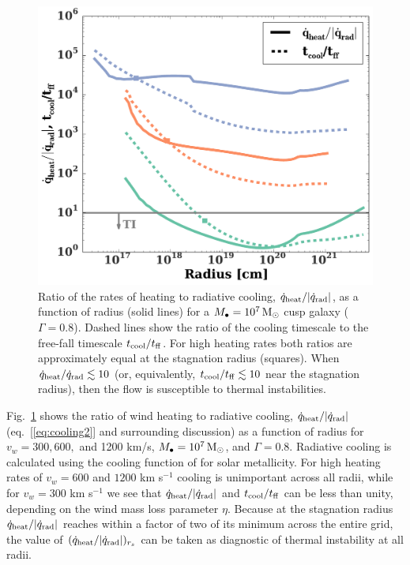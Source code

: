 \documentclass[usenatbib,fleqn]{mn2e}
\newcommand{\Mbh}[1][]{M_{\bullet#1}}
\newcommand{\tcool}{t_{\rm cool}}
\newcommand{\tff}{t_{\rm ff}}
\begin{document}
\begin{figure}
  \includegraphics[width=\columnwidth]{cooling.pdf}
  \caption{\label{fig:cooling} Ratio of the rates of heating to
    radiative cooling, $\dot{q}_{\rm heat}/|\dot{q}_{\rm rad}|$, as a
    function of radius (solid lines) for a $\Mbh=10^7 \Msun$ cusp
    galaxy ($\Gamma=0.8$).  Dashed lines show the ratio of the cooling
    timescale to the free-fall timescale $t_{\rm cool}/t_{\rm ff}$.
    For high heating rates both ratios are approximately equal at the
    stagnation radius (squares).  When $\dot{q}_{\rm
      heat}/\dot{q}_{\rm rad} \lesssim 10$ (or, equivalently, $t_{\rm
      cool}/t_{\rm ff} \lesssim 10$ near the stagnation radius), then
    the flow is susceptible to thermal instabilities.}
\end{figure}


Fig.~\ref{fig:cooling} shows the ratio of wind heating to radiative
cooling, $\dot{q}_{\rm heat}/|\dot{q}_{\rm rad}|$
(eq.~[\ref{eq:cooling2}] and surrounding discussion) as a function of
radius for $v_w=300, 600,$ and 1200 km/s, $\Mbh=10^{7} \Msun$, and
$\Gamma=0.8$.  Radiative cooling is calculated using the cooling
function of \citet{Draine:2011a} for solar metallicity.  For high
heating rates of $v_{w} = 600$ and $1200$ km s$^{-1}$ cooling is
unimportant across all radii, while for $v_{w} = 300$ km s$^{-1}$ we
see that $\dot{q}_{\rm heat}/|\dot{q}_{\rm rad}|$ and $\tcool/\tff$
can be less than unity, depending on the wind mass loss parameter
$\eta$.  Because at the stagnation radius $\dot{q}_{\rm
  heat}/|\dot{q}_{\rm rad}|$ reaches within a factor of two of its
minimum across the entire grid, the value of $(\dot{q}_{\rm
  heat}/|\dot{q}_{\rm rad}|)_{r_{s}}$ can be taken as diagnostic of
thermal instability at all radii.
\end{document}
